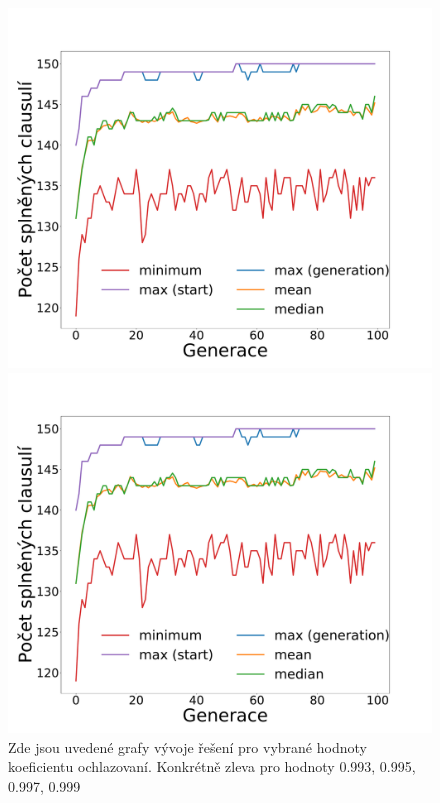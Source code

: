 \documentclass[11pt]{article}
\begin{document}
\begin{figure}
    \begin{minipage}[c]{0.48\textwidth}
        \centering \includegraphics[width=\textwidth]{img/1c.pdf} 
    \end{minipage}
    \begin{minipage}[c]{0.48\textwidth}
        \centering \includegraphics[width=\textwidth]{img/1c.pdf} 
    \end{minipage}
   \caption{Zde jsou uvedené grafy vývoje řešení pro vybrané hodnoty koeficientu ochlazovaní. Konkrétně zleva pro hodnoty 0.993, 0.995, 0.997, 0.999}\label{fig:GVPK}
\end{figure} 
\end{document}
